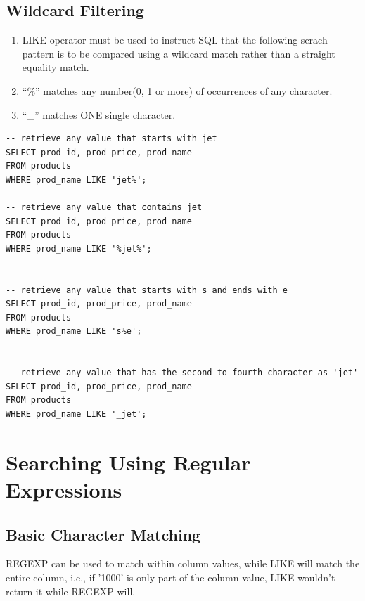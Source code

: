 \documentclass[12pt,oneside,a4paper]{article}
\begin{document}
\subsection{Wildcard Filtering}

\begin{enumerate}
\item \textsf{LIKE} operator must be used to instruct SQL that the following serach pattern is to be compared using a wildcard match rather than a straight equality match. 

\item ``\%'' matches any number(0, 1 or more) of occurrences of any character. 

\item ``\_'' matches ONE single character. 
\end{enumerate}
\begin{lstlisting}
-- retrieve any value that starts with jet 
SELECT prod_id, prod_price, prod_name
FROM products 
WHERE prod_name LIKE 'jet%'; 

-- retrieve any value that contains jet 
SELECT prod_id, prod_price, prod_name
FROM products 
WHERE prod_name LIKE '%jet%'; 


-- retrieve any value that starts with s and ends with e 
SELECT prod_id, prod_price, prod_name
FROM products 
WHERE prod_name LIKE 's%e'; 


-- retrieve any value that has the second to fourth character as 'jet' 
SELECT prod_id, prod_price, prod_name
FROM products 
WHERE prod_name LIKE '_jet'; 

\end{lstlisting} 

\section{Searching Using Regular Expressions}
\subsection{Basic Character Matching}

\textsf{REGEXP} can be used to match within column values, while \textsf{LIKE} will match the entire column, i.e., if '1000' is only part of the column value, \textsf{LIKE} wouldn't return it while \textsf{REGEXP} will. 
\end{document}
